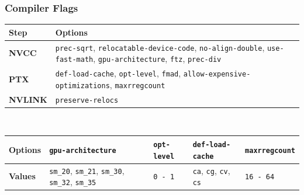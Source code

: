 \documentclass[10pt, compress]{beamer}
\begin{document}
\begin{frame}[fragile]
  \frametitle{Compiler Flags}
\begin{table}[htpb]
    \centering
    \footnotesize
        \begin{tabular}{@{}CL@{}}
        \toprule
        \textbf{Step} & \textbf{Options} \\ \midrule
        \textbf{NVCC} & \texttt{prec-sqrt}, \texttt{relocatable-device-code}, \texttt{no-align-double}, \texttt{use-fast-math}, \texttt{gpu-architecture}, \texttt{ftz}, \texttt{prec-div} \\ \midrule
        \textbf{PTX} &  \texttt{def-load-cache}, \texttt{opt-level}, \texttt{fmad}, \texttt{allow-expensive-optimizations}, \texttt{maxrregcount} \\ \midrule
        \textbf{NVLINK} & \texttt{preserve-relocs} \\ \bottomrule
    \end{tabular}%
    \\ \vspace{0.5cm}
    \begin{tabular}{@{}PKKKK@{}}
        \toprule
        \textbf{\scriptsize Options} & \texttt{\bf \scriptsize gpu-architecture} & \texttt{\bf \scriptsize opt-level} & \texttt{\bf \scriptsize def-load-cache} & \texttt{\bf \scriptsize maxrregcount} \\ \midrule
        \textbf{\scriptsize Values} & \texttt{\scriptsize sm\_20}, \texttt{\scriptsize sm\_21}, \texttt{\scriptsize sm\_30}, \texttt{\scriptsize sm\_32}, \texttt{\scriptsize sm\_35}  & \texttt{\scriptsize 0 - 1}  & \texttt{\scriptsize ca}, \texttt{\scriptsize cg}, \texttt{\scriptsize cv}, \texttt{\scriptsize cs} & \texttt{\scriptsize 16 - 64} \\ \bottomrule
    \end{tabular}
\end{table}
\end{frame}
\end{document}
